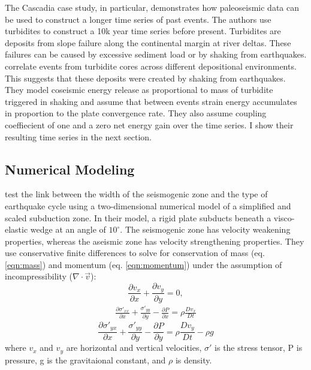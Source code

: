 \documentclass[]{proposalnsf}
\begin{document}
 The Cascadia case study, in particular, demonstrates how paleoseismic data can be used to construct a longer time series of past events. The authors use turbidites to construct a 10k year time series before present. Turbidites are deposits from slope failure along the continental margin at river deltas. These failures can be caused by excessive sediment load or by shaking from earthquakes. \citet{Goldfinger2013} correlate events from turbidite cores across different depositional environments. This suggests that these deposits were created by shaking from earthquakes. They model coseismic energy release as proportional to mass of turbidite triggered in shaking and assume that between events strain energy accumulates in proportion to the plate convergence rate. They also assume coupling coeffiecient of one and a zero net energy gain over the time series. I show their resulting time series in the next section. 

\subsection{Numerical Modeling}

\citet{Herrendorfer2015} test the link between the width of the seismogenic zone and the type of earthquake cycle using a two-dimensional numerical model of a simplified and scaled subduction zone. In their model, a rigid plate subducts beneath a visco-elastic wedge at an angle of $10^\circ$. The seismogenic zone has velocity weakening properties, whereas the aseismic zone has velocity strengthening properties. They use conservative finite differences to solve for conservation of mass (eq. \ref{eqn:mass}) and momentum (eq. \ref{eqn:momentum}) under the assumption of incompressibility ($\nabla \cdot \vec{v}$):
\begin{equation}
	\frac{\partial v_x}{\partial x} + \frac{\partial v_y}{\partial y} = 0,
	\label{eqn:mass}
\end{equation}
\begin{eqnarray}
\frac{\partial \sigma'_{xx}}{\partial x} + \frac{\sigma'_{yy}}{\partial y} - \frac{\partial P}{\partial x} = \rho\frac{Dv_x}{Dt} \nonumber 
\end{eqnarray}
%
\begin{equation}
	\frac{\partial \sigma'_{yx}}{\partial x} + \frac{\sigma'_{yy}}{\partial y} - \frac{\partial P}{\partial y} = \rho\frac{Dv_y}{Dt} - \rho g
	\label{eqn:momentum}
\end{equation}
%
where $v_x$ and $v_y$ are horizontal and vertical velocities, $\sigma'$ is the stress tensor, P is pressure, g is the gravitaional constant, and $\rho$ is density. 
\end{document}
